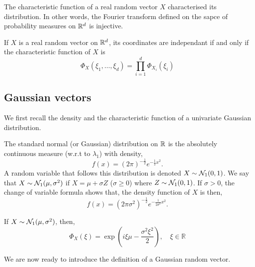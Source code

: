 \documentclass{article}
\begin{document}
\begin{theorem}
  The characteristic function of a real random vector $X$ characterised its
  distribution. In other words, the Fourier transform defined on the sapce of
  probability measures on $\mathbb{R}^{d}$ is injective. 
\end{theorem}

\begin{prop}
  If $X$ is a real random vector on $\mathbb{R}^{d}$, its coordinates are independant if and only if
  the characteristic function of $X$ is
  $$
  \Phi_{X}\left(\xi_{1}, \ldots, \xi_{d}\right)=\prod_{i=1}^{d} \Phi_{X_{i}}\left(\xi_{i}\right)
  $$
\end{prop}

\subsection{Gaussian vectors}

We first recall the density and the characteristic function of a univariate
Gaussian distribution.

\begin{definition} The standard normal (or Gaussian) distribution on $\mathbb{R}$ is the
  absolutely continuous measure (w.r.t to $\lambda_1$) with density, $$f(x)=(2
  \pi)^{-\frac{1}{2}} e^{-\frac{1}{2}x^{2}}.$$
  A random variable that follows this distribution is denoted $X \sim
  \mathcal{N}_1(0,1)$. We say that $X \sim \mathcal{N}_1(\mu,\sigma^2)$ if $X = \mu + \sigma Z$
  ($\sigma \geq 0$) where  $Z \sim \mathcal{N}_1(0,1)$. If $\sigma >0$, the change of variable formula
  shows that, the density function of $X$ is then, $$f(x)=(2
  \pi\sigma^2)^{-\frac{1}{2}} e^{-\frac{1}{2\sigma^2}x^{2}}.$$
\end{definition}

\begin{prop} If $X \sim \mathcal{N}_1(\mu,\sigma^2)$, then, 
  $$
  \Phi_{X}(\xi)=\exp \left(i\xi \mu -\frac{\sigma^{2} \xi^{2}}{2}\right), \quad \xi \in \mathbb{R}
  $$
\end{prop}

We are now ready to introduce the definition of a Gaussian random vector. 
\end{document}
